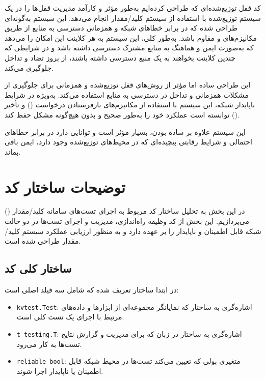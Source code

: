 کد قفل توزیع‌شده‌ای که طراحی کرده‌ایم به‌طور مؤثر و کارآمد مدیریت قفل‌ها را در یک سیستم توزیع‌شده با استفاده از سیستم کلید/مقدار انجام می‌دهد. این سیستم به‌گونه‌ای طراحی شده که در برابر خطاهای شبکه و همزمانی دسترسی به منابع از طریق مکانیزم‌های  و  مقاوم باشد. به‌طور کلی، این سیستم به هر کلاینت این امکان را می‌دهد که به‌صورت ایمن و هماهنگ به منابع مشترک دسترسی داشته باشد و در شرایطی که چندین کلاینت بخواهند به یک منبع دسترسی داشته باشند، از بروز تضاد و تداخل جلوگیری می‌کند.

این طراحی ساده اما مؤثر از روش‌های قفل توزیع‌شده و همزمانی برای جلوگیری از مشکلات همزمانی و تداخل در دسترسی به منابع استفاده می‌کند. به‌ویژه در شرایط ناپایدار شبکه، این سیستم با استفاده از مکانیزم‌های بازفرستادن درخواست () و تأخیر () توانسته است عملکرد خود را به‌طور صحیح و بدون هیچ‌گونه مشکل حفظ کند.

این سیستم علاوه بر ساده بودن، بسیار مؤثر است و توانایی دارد در برابر خطاهای احتمالی و شرایط رقابتی پیچیده‌ای که در محیط‌های توزیع‌شده وجود دارد، ایمن باقی بماند.

\section*{توضیحات ساختار کد }

در این بخش به تحلیل ساختار کد مربوط به اجرای تست‌های سامانه کلید/مقدار () می‌پردازیم. این بخش از کد وظیفه راه‌اندازی، مدیریت و اجرای تست‌ها در دو حالت شبکه قابل اطمینان و ناپایدار را بر عهده دارد و به منظور ارزیابی عملکرد سیستم کلید/مقدار طراحی شده است.

\subsection*{ساختار کلی کد}

در ابتدا ساختار  تعریف شده که شامل سه فیلد اصلی است:

\begin{itemize}
  \item \texttt{kvtest.Test}: اشاره‌گری به ساختار  که نمایانگر مجموعه‌ای از ابزارها و داده‌های مرتبط با اجرای یک تست کلی است.
  \item \texttt{t testing.T}: اشاره‌گری به ساختار  در زبان  که برای مدیریت و گزارش نتایج تست‌ها به کار می‌رود.
  \item \texttt{reliable bool}: متغیری بولی که تعیین می‌کند تست‌ها در محیط شبکه قابل اطمینان  یا ناپایدار  اجرا شوند.
\end{itemize}

